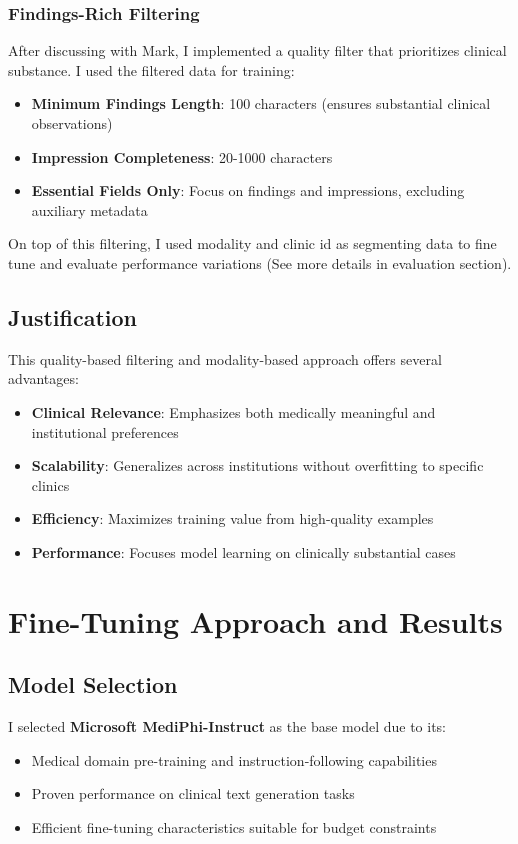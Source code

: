 \documentclass[11pt,letterpaper]{article}
\begin{document}
\subsubsection{Findings-Rich Filtering}
After discussing with Mark, I implemented a quality filter that prioritizes clinical substance. I used the filtered data for training:
\begin{itemize}
    \item \textbf{Minimum Findings Length}: 100 characters (ensures substantial clinical observations)
    \item \textbf{Impression Completeness}: 20-1000 characters
    \item \textbf{Essential Fields Only}: Focus on findings and impressions, excluding auxiliary metadata
\end{itemize}

On top of this filtering, I used modality and clinic id as segmenting data to fine tune and evaluate performance variations (See more details in evaluation section).

\subsection{Justification}

This quality-based filtering and modality-based approach offers several advantages:
\begin{itemize}
    \item \textbf{Clinical Relevance}: Emphasizes both medically meaningful and institutional preferences
    \item \textbf{Scalability}: Generalizes across institutions without overfitting to specific clinics
    \item \textbf{Efficiency}: Maximizes training value from high-quality examples
    \item \textbf{Performance}: Focuses model learning on clinically substantial cases
\end{itemize}

\section{Fine-Tuning Approach and Results}

\subsection{Model Selection}
I selected \textbf{Microsoft MediPhi-Instruct} as the base model due to its:
\begin{itemize}
    \item Medical domain pre-training and instruction-following capabilities
    \item Proven performance on clinical text generation tasks
    \item Efficient fine-tuning characteristics suitable for budget constraints
\end{itemize}
\end{document}
